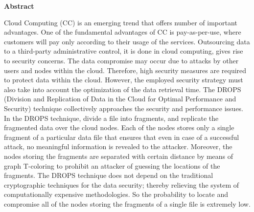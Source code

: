 
\begin{titlepage}
\begin{center}
\textbf{\LARGE{Abstract}}\\[1cm]
\end{center}
\normalsize
\par Cloud Computing (CC) is an emerging trend that offers number of important advantages. One of the fundamental advantages of CC is pay-as-per-use, where customers will pay only according to their usage of the services. Outsourcing data to a third-party administrative control, it is done in cloud computing, gives rise to security concerns. The data compromise may occur due to attacks by other users and nodes within the cloud. Therefore, high security measures are required to protect data within the cloud. However, the employed security strategy must also take into account the optimization of the data retrieval time. The DROPS (Division and Replication of Data in the Cloud for Optimal Performance and Security) technique collectively approaches the security and performance issues. In the DROPS technique, divide a file into fragments, and replicate the fragmented data over the cloud nodes. Each of the nodes stores only a single fragment of a particular data file that ensures that even in case of a successful attack, no meaningful information is revealed to the attacker. Moreover, the nodes storing the fragments are separated with certain distance by means of graph T-coloring to prohibit an attacker of guessing the locations of the fragments. The DROPS technique does not depend on the traditional cryptographic techniques for the data security; thereby relieving the system of computationally expensive methodologies. So the probability to locate and compromise all of the nodes storing the fragments of a single file is extremely low.
\end{titlepage}
